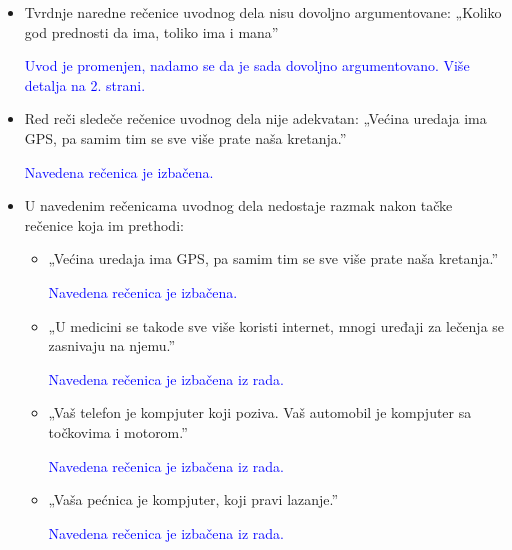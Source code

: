 \documentclass[a4paper]{report}
\newcommand{\odgovor}[1]{\textcolor{blue}{#1}}
\begin{document}
\begin{itemize}
    \item Tvrdnje naredne rečenice uvodnog dela nisu dovoljno argumentovane:\newline
    „Koliko god prednosti da ima, toliko ima i mana”
    
    \odgovor{Uvod je promenjen, nadamo se da je sada dovoljno argumentovano. Više detalja na 2. strani.}
    
\end{itemize}
\begin{itemize}
    \item Red reči sledeče rečenice uvodnog dela nije adekvatan:\newline
    „Većina uredaja ima GPS, pa samim tim se sve više prate naša kretanja.”
    
     \odgovor{Navedena rečenica je izbačena.}
    
\end{itemize}
\begin{itemize}
    \item U navedenim rečenicama uvodnog dela nedostaje razmak nakon tačke rečenice koja im prethodi:
    \begin{itemize}
        \item „Većina uredaja ima GPS, pa samim tim se sve više prate naša kretanja.”
        
        \odgovor{Navedena rečenica je izbačena.}
                
    \end{itemize}
    \begin{itemize}
        \item „U medicini se takode sve više koristi internet, mnogi uređaji za lečenja se zasnivaju na njemu.”
        
        \odgovor{Navedena rečenica je izbačena iz rada.}
        
    \end{itemize}
    \begin{itemize}
        \item „Vaš telefon je kompjuter koji poziva. Vaš automobil je kompjuter sa točkovima i motorom.”
        
        \odgovor{Navedena rečenica je izbačena iz rada.}
        
        
    \end{itemize}
        \begin{itemize}
        \item „Vaša pećnica je kompjuter, koji pravi lazanje.”
        
        \odgovor{Navedena rečenica je izbačena iz rada.}
        
        
    \end{itemize}
\end{itemize}
\end{document}
